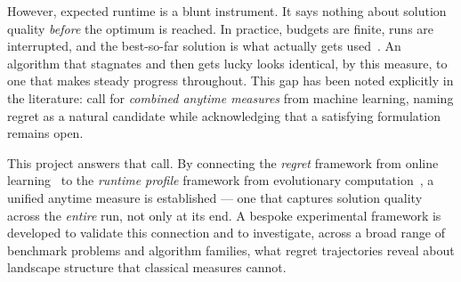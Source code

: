 However, expected runtime is a blunt instrument. It says nothing
about solution quality \textit{before} the optimum is reached.
In practice, budgets are finite, runs are interrupted, and the
best-so-far solution is what actually gets used~\cite{jansen2014fixed}.
An algorithm that stagnates and then gets lucky looks identical, by
this measure, to one that makes steady progress throughout. This gap
has been noted explicitly in the literature:
\citet{pinto2018practice} call for \textit{combined anytime
measures} from machine learning, naming regret as a natural candidate
while acknowledging that a satisfying formulation remains open.

This project answers that call. By connecting the \textit{regret}
framework from online learning~\cite{cesa2006prediction,lattimore2020bandit}
to the \textit{runtime profile} framework from evolutionary
computation~\cite{pinto2018practice}, a unified anytime measure
is established — one that captures solution quality across the
\textit{entire} run, not only at its end. A bespoke experimental
framework is developed to validate this connection and to investigate,
across a broad range of benchmark problems and algorithm families,
what regret trajectories reveal about landscape structure that
classical measures cannot.



